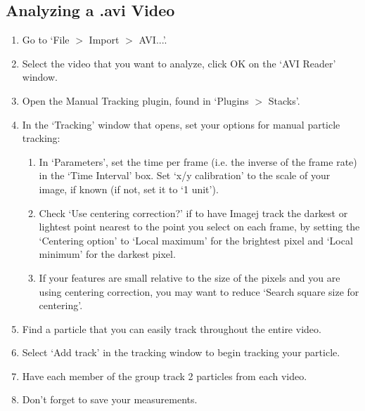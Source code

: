 \subsection{Analyzing a .avi Video}
\begin{enumerate}
\item Go to `File $>$ Import $>$ AVI...'.
\item Select the video that you want to analyze, click OK on the `AVI Reader' window.
\item Open the Manual Tracking plugin, found in `Plugins $>$ Stacks'.
\item In the `Tracking' window that opens, set your options for manual particle tracking:
	\begin{enumerate}
	\item In `Parameters', set the time per frame (i.e. the inverse of the frame rate) in the `Time Interval' box. Set `x/y calibration' to the scale of your image, if known (if not, set it to `1 unit').
	\item Check `Use centering correction?' if to have Imagej track the darkest or lightest point nearest to the point you select on each frame, by setting the `Centering option' to `Local maximum' for the brightest pixel and `Local minimum' for the darkest pixel.
	\item If your features are small relative to the size of the pixels and you are using centering correction, you may want to reduce `Search square size for centering'.
	\end{enumerate}
\item Find a particle that you can easily track throughout the entire video.
\item Select `Add track' in the tracking window to begin tracking your particle.
\item Have each member of the group track 2 particles from each video.
\item Don't forget to save your measurements.
\end{enumerate}

